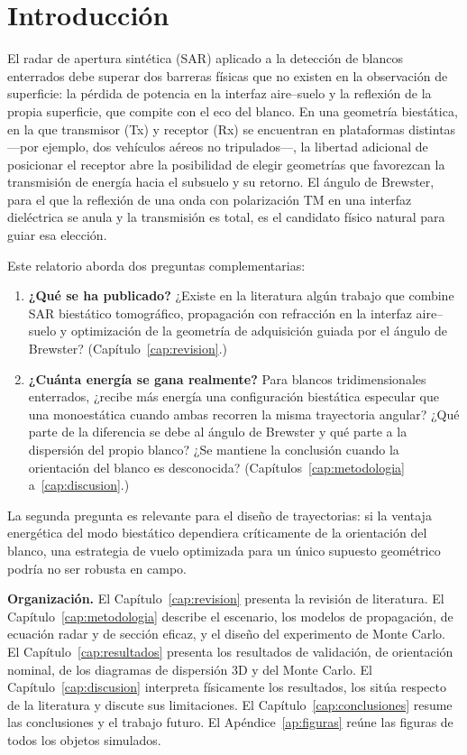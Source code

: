 \documentclass[11pt,a4paper]{report}
\begin{document}
\chapter{Introducción}
\label{cap:intro}

El radar de apertura sintética (SAR) aplicado a la detección de blancos
enterrados debe superar dos barreras físicas que no existen en la
observación de superficie: la pérdida de potencia en la interfaz aire--suelo
y la reflexión de la propia superficie, que compite con el eco del blanco.
En una geometría biestática, en la que transmisor (Tx) y receptor (Rx) se
encuentran en plataformas distintas ---por ejemplo, dos vehículos aéreos no
tripulados---, la libertad adicional de posicionar el receptor abre la
posibilidad de elegir geometrías que favorezcan la transmisión de energía
hacia el subsuelo y su retorno. El ángulo de Brewster, para el que la
reflexión de una onda con polarización TM en una interfaz dieléctrica se
anula y la transmisión es total, es el candidato físico natural para guiar
esa elección.

Este relatorio aborda dos preguntas complementarias:

\begin{enumerate}[itemsep=2pt]
  \item \textbf{¿Qué se ha publicado?} ¿Existe en la literatura algún
  trabajo que combine SAR biestático tomográfico, propagación con
  refracción en la interfaz aire--suelo y optimización de la geometría de
  adquisición guiada por el ángulo de Brewster? (Capítulo~\ref{cap:revision}.)
  \item \textbf{¿Cuánta energía se gana realmente?} Para blancos
  tridimensionales enterrados, ¿recibe más energía una configuración
  biestática especular que una monoestática cuando ambas recorren la misma
  trayectoria angular? ¿Qué parte de la diferencia se debe al ángulo de
  Brewster y qué parte a la dispersión del propio blanco? ¿Se mantiene la
  conclusión cuando la orientación del blanco es desconocida?
  (Capítulos~\ref{cap:metodologia} a~\ref{cap:discusion}.)
\end{enumerate}

La segunda pregunta es relevante para el diseño de trayectorias: si la
ventaja energética del modo biestático dependiera críticamente de la
orientación del blanco, una estrategia de vuelo optimizada para un único
supuesto geométrico podría no ser robusta en campo.

\textbf{Organización.} El Capítulo~\ref{cap:revision} presenta la revisión
de literatura. El Capítulo~\ref{cap:metodologia} describe el escenario, los
modelos de propagación, de ecuación radar y de sección eficaz, y el diseño
del experimento de Monte Carlo. El Capítulo~\ref{cap:resultados} presenta
los resultados de validación, de orientación nominal, de los diagramas de
dispersión 3D y del Monte Carlo. El Capítulo~\ref{cap:discusion} interpreta
físicamente los resultados, los sitúa respecto de la literatura y discute
sus limitaciones. El Capítulo~\ref{cap:conclusiones} resume las conclusiones
y el trabajo futuro. El Apéndice~\ref{ap:figuras} reúne las figuras de todos
los objetos simulados.
\end{document}
